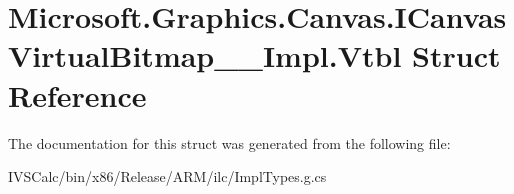 \hypertarget{struct_microsoft_1_1_graphics_1_1_canvas_1_1_i_canvas_virtual_bitmap_____impl_1_1_vtbl}{}\section{Microsoft.\+Graphics.\+Canvas.\+I\+Canvas\+Virtual\+Bitmap\+\_\+\+\_\+\+Impl.\+Vtbl Struct Reference}
\label{struct_microsoft_1_1_graphics_1_1_canvas_1_1_i_canvas_virtual_bitmap_____impl_1_1_vtbl}


The documentation for this struct was generated from the following file\+:\begin{DoxyCompactItemize}
\item 
I\+V\+S\+Calc/bin/x86/\+Release/\+A\+R\+M/ilc/Impl\+Types.\+g.\+cs\end{DoxyCompactItemize}
